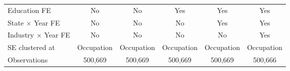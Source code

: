 \begin{tabular}{l*{5}{c}}
Education FE&          No   &          No   &         Yes   &         Yes   &         Yes   \\
State $\times$ Year FE&          No   &          No   &          No   &         Yes   &         Yes   \\
Industry $\times$ Year FE&          No   &          No   &          No   &          No   &         Yes   \\
SE clustered at&  Occupation   &  Occupation   &  Occupation   &  Occupation   &  Occupation   \\
Observations&     500,669   &     500,669   &     500,669   &     500,669   &     500,666   \\
\bottomrule
\end{tabular}
